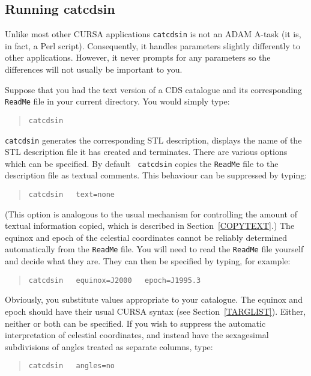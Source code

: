\documentclass[twoside,11pt]{article}
\renewcommand{\_}{\texttt{\symbol{95}}}
\begin{document}
\subsection{Running catcdsin}

Unlike most other CURSA applications {\tt catcdsin} is not an ADAM
A-task (it is, in fact, a Perl script).  Consequently, it handles
parameters slightly differently to other applications.  However,
it never prompts for any parameters so the differences will not usually
be important to you.

Suppose that you had the text version of a CDS catalogue and its
corresponding {\tt ReadMe} file in your current directory.  You would
simply type:

\begin{verse}
{\tt catcdsin}
\end{verse}

{\tt catcdsin} generates the corresponding STL description, displays
the name of the STL description file it has created and terminates.
There are various options which can be specified.  By default {\tt
catcdsin} copies the {\tt ReadMe} file to the description file as
textual comments.  This behaviour can be suppressed by typing:

\begin{verse}
{\tt catcdsin ~ text=none}
\end{verse}

(This option is analogous to the usual mechanism for controlling the
amount of textual information copied, which is described in
Section~\ref{COPYTEXT}.)  The equinox and epoch of the celestial
coordinates cannot be reliably determined automatically from the
{\tt ReadMe} file.  You will need to read the {\tt ReadMe} file
yourself and decide what they are.  They can then be specified by
typing, for example:

\begin{verse}
{\tt catcdsin ~ equinox=J2000 ~ epoch=J1995.3}
\end{verse}

Obviously, you substitute values appropriate to your catalogue.  The
equinox and epoch should have their usual CURSA syntax (see
Section~\ref{TARGLIST}).  Either, neither or both can be specified.
If you wish to suppress the automatic interpretation of celestial
coordinates, and instead have the sexagesimal subdivisions of angles
treated as separate columns, type:

\begin{verse}
{\tt catcdsin ~ angles=no}
\end{verse}
\end{document}
